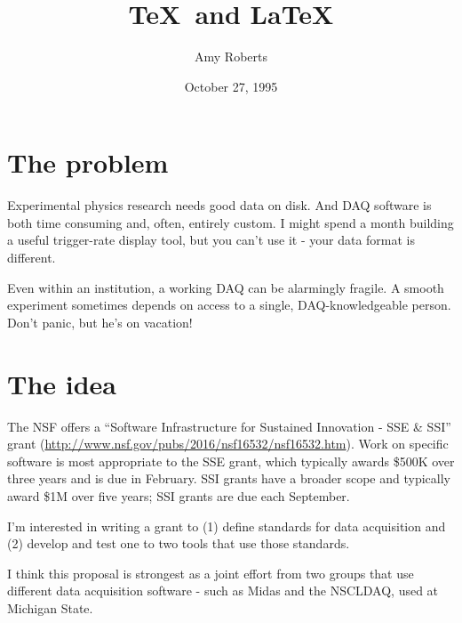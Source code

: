 \documentclass[]{report}   %
\begin{document}
\title{\TeX\ and \LaTeX}   %
\author{Amy Roberts}         %
\date{October 27, 1995}    %


\section*{The problem}     %

Experimental physics research needs good data on disk.  And DAQ software is both time consuming and, often, entirely custom.  I might spend a month building a useful trigger-rate display tool, but you can't use it - your data format is different.  

Even within an institution, a working DAQ can be alarmingly fragile.  A smooth experiment sometimes depends on access to a single, DAQ-knowledgeable person.  Don't panic, but he's on vacation!  


\section*{The idea}     %
The NSF offers a ``Software Infrastructure for Sustained Innovation - SSE \& SSI'' grant
(\url{http://www.nsf.gov/pubs/2016/nsf16532/nsf16532.htm}).  Work on specific software is most appropriate to the SSE grant, which typically awards \$500K over three years and is due in February.  SSI grants have a broader scope and typically award \$1M over five years; SSI grants are due each September.

I'm interested in writing a grant to (1) define standards for data acquisition and (2) develop and test one to two tools that use those standards.  

I think this proposal is strongest as a joint effort from two groups that use different data acquisition software - such as Midas and the NSCLDAQ, used at Michigan State.
\end{document}
